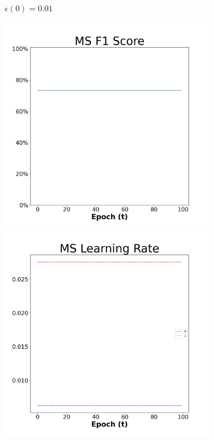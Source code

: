 \begin{figure}[H]
\begin{subfigure}{0.3\textwidth}
  \caption{$\epsilon(0)=0.01$}
\end{subfigure}\hfil %
\begin{subfigure}{0.3\textwidth}
  \includegraphics[width=\linewidth]{images/exper2/SP/MS_0.03_f1.png}
  \includegraphics[width=\linewidth]{images/exper2/SP/MS_0.03_lr.png}

\end{subfigure}
\end{figure}
